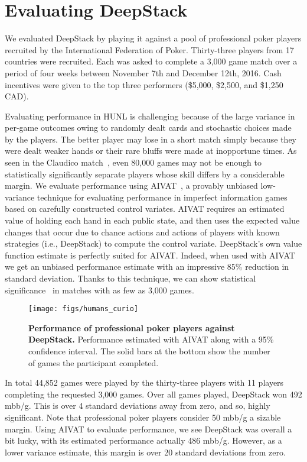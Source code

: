 \documentclass[12pt]{article}
\newif\iffinal
\newcommand{\HUNL}{{HUNL}}
\begin{document}
\section*{Evaluating DeepStack}

We evaluated DeepStack by playing it against a pool of professional poker players recruited by the International Federation of Poker\cite{IFP}.  Thirty-three players from 17 countries were recruited.  Each was asked to complete a 3,000 game match over a period of four weeks between November 7th and December 12th, 2016.  Cash incentives were given to the top three performers (\$5,000, \$2,500, and \$1,250 CAD).  

Evaluating performance in \HUNL{} is challenging because of the large variance in per-game outcomes owing to randomly dealt cards and stochastic choices made by the players.  The better player may lose in a short match simply because they were dealt weaker hands or their rare bluffs were made at inopportune times.  As seen in the Claudico match~\cite{Wood15:PokerFuse-Claudico}, even 80,000 games may not be enough to statistically significantly separate players whose skill differs by a considerable margin.  We evaluate performance using AIVAT~\cite{Burch17:AIVAT}, a provably unbiased low-variance technique for evaluating performance in imperfect information games based on carefully constructed control variates.  AIVAT requires an estimated value of holding each hand in each public state, and then uses the expected value changes that occur due to chance actions and actions of players with known strategies (i.e., DeepStack) to compute the control variate.  DeepStack's own value function estimate is perfectly suited for AIVAT.  Indeed, when used with AIVAT we get an unbiased performance estimate with an impressive $85\%$ reduction in standard deviation.  Thanks to this technique, we can show statistical significance~\cite{stat-sig} in matches with as few as 3,000 games.  

\iffinal\else 
\begin{figure}[t]
\centering
\texttt{[image: figs/humans\_curio]}
\caption{{\bf Performance of professional poker players against DeepStack.}  Performance estimated with AIVAT along with a 95\% confidence interval. The solid bars at the bottom show the number of games the participant completed.}\label{fig:humans}
\end{figure}
\fi

In total 44,852 games were played by the thirty-three players with 11 players completing the requested 3,000 games.
Over all games played, DeepStack won 492 mbb/g.  This is over 4 standard deviations away from zero, and so, highly significant.  Note that professional poker players consider 50 mbb/g a sizable margin.  Using AIVAT to evaluate performance, we see DeepStack was overall a bit lucky, with its estimated performance actually 486 mbb/g.  However, as a lower variance estimate, this margin is over 20 standard deviations from zero.
\end{document}
